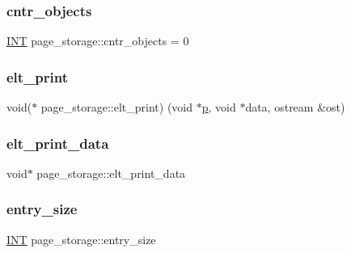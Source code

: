 \subsubsection{\texorpdfstring{cntr\+\_\+objects}{cntr\_objects}}
{\footnotesize\ttfamily \mbox{\hyperlink{galois_8h_a09fddde158a3a20bd2dcadb609de11dc}{I\+NT}} page\+\_\+storage\+::cntr\+\_\+objects = 0\hspace{0.3cm}{\ttfamily [static]}}

\mbox{\label{classpage__storage_aa21cef3dca005352aa9e447ab5070c85}} 
\subsubsection{\texorpdfstring{elt\+\_\+print}{elt\_print}}
{\footnotesize\ttfamily void($\ast$  page\+\_\+storage\+::elt\+\_\+print) (void $\ast$\mbox{\hyperlink{alphabet2_8_c_a533391314665d6bf1b5575e9a9cd8552}{p}}, void $\ast$data, ostream \&ost)}

\mbox{\label{classpage__storage_aec80ee934d016857f972cfd2e95a7344}} 
\subsubsection{\texorpdfstring{elt\+\_\+print\+\_\+data}{elt\_print\_data}}
{\footnotesize\ttfamily void$\ast$ page\+\_\+storage\+::elt\+\_\+print\+\_\+data}

\mbox{\label{classpage__storage_a1b79146c33d9a8e86fb3bfce780929d8}} 
\subsubsection{\texorpdfstring{entry\+\_\+size}{entry\_size}}
{\footnotesize\ttfamily \mbox{\hyperlink{galois_8h_a09fddde158a3a20bd2dcadb609de11dc}{I\+NT}} page\+\_\+storage\+::entry\+\_\+size}

